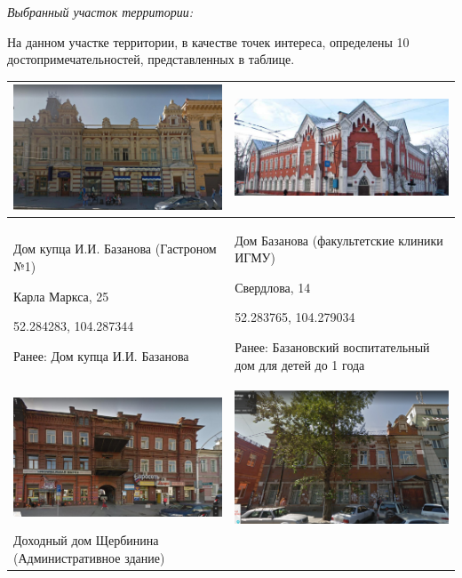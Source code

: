 \solutionSection

\textit{Выбранный участок территории:}


На данном участке территории, в качестве точек интереса, определены 10 достопримечательностей, представленных в таблице.

\begin{tabular}{|p{8cm}|p{8cm}|}
    \hline
    \includegraphics[width=6.5cm]{2} & \includegraphics[width=8cm]{3} \\
    \hline
    Дом купца И.И. Базанова  (Гастроном №1)

    Карла Маркса, 25 
    
    52.284283, 104.287344
    
    Ранее: Дом купца И.И. Базанова & Дом Базанова (факультетские клиники ИГМУ) 

    Свердлова, 14 

    52.283765, 104.279034

    Ранее: Базановский воспитательный дом для детей до 1 года \\
    \hline
    \includegraphics[width=7cm]{4} & \includegraphics[width=6.5cm]{5} \\
    \hline
    Доходный дом Щербинина (Административное здание)


\end{tabular}
